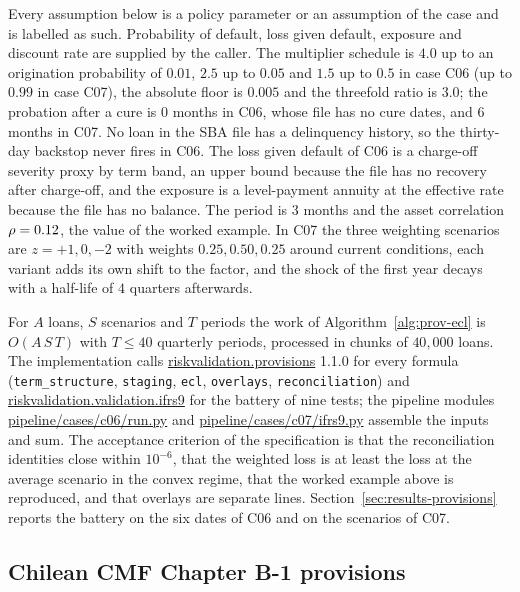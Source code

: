 Every assumption below is a policy parameter or an assumption of the case and is labelled as such. Probability of default, loss given default, exposure and discount rate are supplied by the caller. The multiplier schedule is $4.0$ up to an origination probability of
$0.01$, $2.5$ up to $0.05$ and $1.5$ up to $0.5$ in case C06 (up to $0.99$ in case C07), the absolute floor is $0.005$ and the threefold ratio is $3.0$; the probation after a cure is $0$ months in C06, whose file has no cure dates, and $6$ months in C07. No loan in the SBA file has a
delinquency history, so the thirty-day backstop never fires in C06. The loss given default of C06 is a charge-off severity proxy by term band, an upper bound because the file has no recovery after charge-off, and the exposure is a level-payment annuity at the effective rate because the file has no balance. The
period is $3$ months and the asset correlation $\rho=0.12$, the value of the worked example. In C07 the three weighting scenarios are $z=+1,0,-2$ with weights $0.25,0.50,0.25$ around current conditions, each variant adds its own shift to the factor, and the shock of the first year decays with a half-life of $4$ quarters afterwards.

For $A$ loans, $S$ scenarios and $T$ periods the work of Algorithm~\ref{alg:prov-ecl} is $O(A\,S\,T)$ with $T\le40$ quarterly periods, processed in chunks of $40{,}000$ loans. The implementation calls \url{riskvalidation.provisions} 1.1.0 for every formula
(\texttt{term\_structure}, \texttt{staging}, \texttt{ecl}, \texttt{overlays}, \texttt{reconciliation}) and \url{riskvalidation.validation.ifrs9} for the battery of nine tests; the pipeline modules \url{pipeline/cases/c06/run.py} and \url{pipeline/cases/c07/ifrs9.py} assemble the inputs and
sum. The acceptance criterion of the specification is that the reconciliation identities close within $10^{-6}$, that the weighted loss is at least the loss at the average scenario in the convex regime, that the worked example above is reproduced, and that overlays are separate lines. Section~\ref{sec:results-provisions} reports the
battery on the six dates of C06 and on the scenarios of C07.

\subsection{Chilean CMF Chapter B-1 provisions}
\label{sec:m12}

